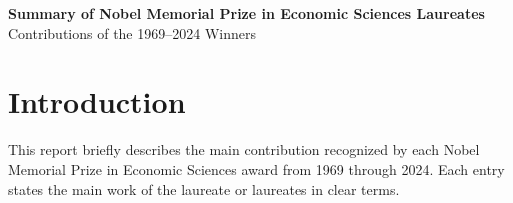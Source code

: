 \documentclass[12pt]{report}
\begin{document}
\begin{titlepage}
    \centering
    \vspace*{\fill}
    {\Huge\textbf{Summary of Nobel Memorial Prize in Economic Sciences Laureates}}\\[1.5cm]
    {\Large Contributions of the 1969--2024 Winners}\\[2cm]
    \vspace*{\fill}
\end{titlepage}

\tableofcontents
\chapter*{Introduction}
This report briefly describes the main contribution recognized by each Nobel Memorial Prize in Economic Sciences award from 1969 through 2024. Each entry states the main work of the laureate or laureates in clear terms.
\end{document}

